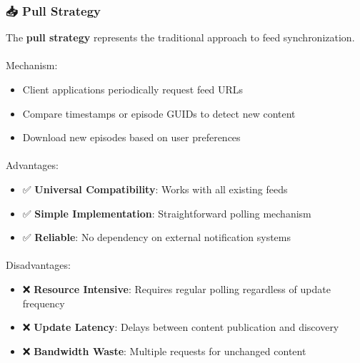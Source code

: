 \documentclass[
  letterpaper,
  DIV=11,
  numbers=noendperiod]{scrartcl}
\makeatletter
\let\oldparagraph\paragraph
\renewcommand{\paragraph}{
    \@ifstar
      \xxxParagraphStar
      \xxxParagraphNoStar
  }
\newcommand{\xxxParagraphStar}[1]{\oldparagraph*{#1}\mbox{}}
\newcommand{\xxxParagraphNoStar}[1]{\oldparagraph{#1}\mbox{}}
\providecommand{\tightlist}{%
  \setlength{\itemsep}{0pt}\setlength{\parskip}{0pt}}\usepackage{longtable,booktabs,array}
\makeatother
\begin{document}
\subsubsection{📥 Pull Strategy}\label{pull-strategy}

The \textbf{pull strategy} represents the traditional approach to feed
synchronization.

\paragraph{Mechanism:}\label{mechanism}

\begin{itemize}
\tightlist
\item
  Client applications periodically request feed URLs
\item
  Compare timestamps or episode GUIDs to detect new content
\item
  Download new episodes based on user preferences
\end{itemize}

\paragraph{Advantages:}\label{advantages}

\begin{itemize}
\tightlist
\item
  ✅ \textbf{Universal Compatibility}: Works with all existing feeds
\item
  ✅ \textbf{Simple Implementation}: Straightforward polling mechanism
\item
  ✅ \textbf{Reliable}: No dependency on external notification systems
\end{itemize}

\paragraph{Disadvantages:}\label{disadvantages}

\begin{itemize}
\tightlist
\item
  ❌ \textbf{Resource Intensive}: Requires regular polling regardless of
  update frequency
\item
  ❌ \textbf{Update Latency}: Delays between content publication and
  discovery
\item
  ❌ \textbf{Bandwidth Waste}: Multiple requests for unchanged content
\end{itemize}
\end{document}
